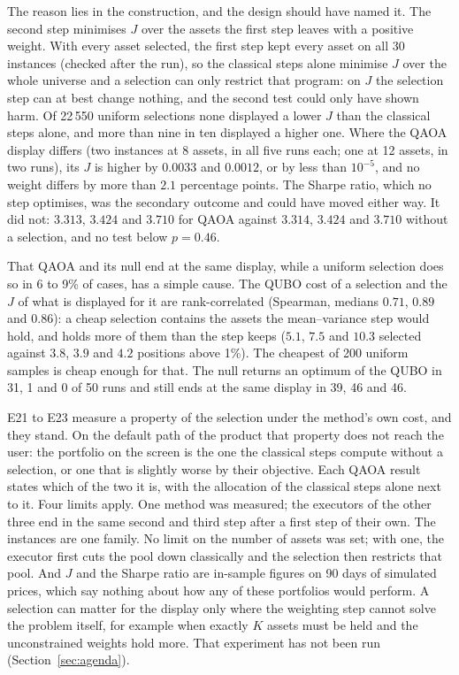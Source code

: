 \documentclass[11pt,a4paper]{article}
\begin{document}
The reason lies in the construction, and the design should have named it.
The second step minimises $J$ over the assets the first step leaves with a
positive weight. With every asset selected, the first step kept every asset
on all 30 instances (checked after the run), so the classical steps alone
minimise $J$ over the whole universe and a selection can only restrict that
program: on $J$ the selection step can at best change nothing, and the
second test could only have shown harm. Of 22\,550 uniform selections none
displayed a lower $J$ than the classical steps alone, and more than nine in
ten displayed a higher one. Where the QAOA display differs (two instances at
8 assets, in all five runs each; one at 12 assets, in two runs), its $J$ is
higher by $0.0033$ and $0.0012$, or by less than $10^{-5}$, and no weight
differs by more than $2.1$ percentage points. The Sharpe
ratio, which no step optimises, was the secondary outcome and could have
moved either way. It did not: $3.313$, $3.424$ and $3.710$ for QAOA against
$3.314$, $3.424$ and $3.710$ without a selection, and no test below
$p = 0.46$.

That QAOA and its null end at the same display, while a uniform selection
does so in 6 to 9\% of cases, has a simple cause. The QUBO cost of a
selection and the $J$ of what is displayed for it are rank-correlated
(Spearman, medians $0.71$, $0.89$ and $0.86$): a cheap selection contains
the assets the mean--variance step would hold, and holds more of them than
the step keeps ($5.1$, $7.5$ and $10.3$ selected against $3.8$, $3.9$ and
$4.2$ positions above 1\%). The cheapest of 200 uniform samples is cheap
enough for that. The null returns an optimum of the QUBO in 31, 1 and 0 of
50 runs and still ends at the same display in 39, 46 and 46.

E21 to E23 measure a property of the selection under the method's own cost,
and they stand. On the default path of the product that property does not
reach the user: the portfolio on the screen is the one the classical steps
compute without a selection, or one that is slightly worse by their
objective. Each QAOA result states which of the two it is, with the
allocation of the classical steps alone next to it. Four limits apply. One
method was measured; the executors of the other three end in the same second
and third step after a first step of their own. The instances are one
family. No limit on the number of assets was set; with one, the executor
first cuts the pool down classically and the selection then restricts that
pool. And $J$ and the Sharpe ratio are in-sample figures on 90 days of
simulated prices, which say nothing about how any of these portfolios would
perform. A selection can matter for the display only where the weighting
step cannot solve the problem itself, for example when exactly $K$ assets
must be held and the unconstrained weights hold more. That experiment has
not been run (Section~\ref{sec:agenda}).
\end{document}

